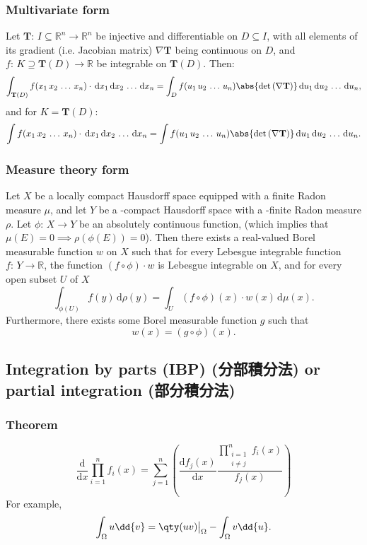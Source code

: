 \documentclass[a4paper,12pt]{report}
\begin{document}
\begin{itemize}
\begin{itemize}
\subsubsection{Multivariate form}
Let $\mathbf{T}:\,I\subseteq\mathbb{R}^n\to\mathbb{R}^n$ be injective and differentiable on $D\subseteq I$, with all elements of its gradient (i.e. Jacobian matrix) $\nabla\mathbf{T}$ being continuous on $D$, and $f:\,K\supseteq\mathbf{T}(D)\to\mathbb{R}$ be integrable on $\mathbf{T}(D)$. Then:
\[\int_{\mathbf{T}(D)}f(x_1\,x_2\,\dots\,x_n)\cdot\,\mathrm{d}x_1\,\mathrm{d}x_2\,\dots\,\mathrm{d}x_n=\int_D f(u_1\,u_2\,\dots\,u_n)\abs{\det\left(\nabla\mathbf{T}\right)}\,\mathrm{d}u_1\,\mathrm{d}u_2\,\dots\,\mathrm{d}u_n,\]
and for $K=\mathbf{T}(D)$:
\[\int f(x_1\,x_2\,\dots\,x_n)\cdot\,\mathrm{d}x_1\,\mathrm{d}x_2\,\dots\,\mathrm{d}x_n=\int f(u_1\,u_2\,\dots\,u_n)\abs{\det\left(\nabla\mathbf{T}\right)}\,\mathrm{d}u_1\,\mathrm{d}u_2\,\dots\,\mathrm{d}u_n.\]
\subsubsection{Measure theory form}
Let $X$ be a locally compact Hausdorff space equipped with a finite Radon measure $μ$, and let $Y$ be a \text{\textsigma}-compact Hausdorff space with a \text{\textsigma}-finite Radon measure $\rho$. Let $\phi:\,X\to Y$ be an absolutely continuous function, (which implies that $\mu(E)=0\implies\rho(\phi(E))=0$). Then there exists a real-valued Borel measurable function $w$ on $X$ such that for every Lebesgue integrable function $f:\,Y\to\mathbb{R}$, the function $(f\circ\phi)\cdot w$ is Lebesgue integrable on $X$, and for every open subset $U$ of $X$
\[\int_{\phi(U)}f(y)\,\mathrm{d}\rho(y)=\int_U(f\circ\phi)(x)\cdot w(x)\,\mathrm{d}\mu(x).\]
Furthermore, there exists some Borel measurable function $g$ such that 
\[w(x)=(g\circ\phi)(x).\]
\subsection{Integration by parts (IBP) (分部積分法) or partial integration (部分積分法)}
\subsubsection{Theorem}
\[\frac{\mathrm{d}}{\mathrm{d}x}\prod_{i=1}^nf_i(x)=\sum_{j=1}^n\left(\frac{\mathrm{d}f_j(x)}{\mathrm{d}x}\frac{\prod_{\substack{i=1\\i\neq j}}^n f_i(x)}{f_j(x)}\right)\]
For example,
\[\int_{\Omega} u\dd{v} = \qty(u v)\big\vert_{\Omega} - \int_{\Omega} v\dd{u}.\]

\end{itemize}
\end{itemize}
\end{document}
